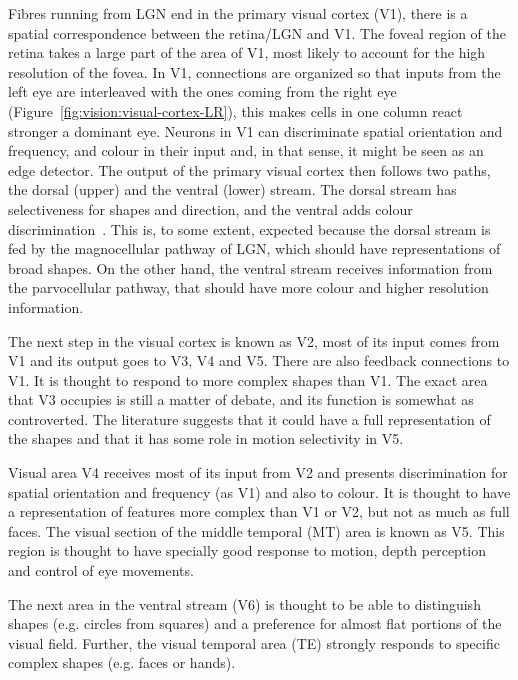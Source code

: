 Fibres running from LGN end in the primary visual cortex (V1), there is a spatial correspondence between the retina/LGN and V1. The foveal region of the retina takes a large part of the area of V1, most likely to account for the high resolution of the fovea. In V1, connections are organized so that inputs from the left eye are interleaved with the ones coming from the right eye (Figure~\ref{fig:vision:visual-cortex-LR}), this makes cells in one column react stronger a dominant eye. Neurons in V1 can discriminate spatial orientation and frequency, and colour in their input and, in that sense, it might be seen as an edge detector. The output of the primary visual cortex then follows two paths, the dorsal (upper) and the ventral (lower) stream. The dorsal stream has selectiveness for shapes and direction, and the ventral adds colour discrimination~\cite{thompson2000brain}. This is, to some extent, expected because the dorsal stream is fed by the magnocellular pathway of LGN, which should have representations of broad shapes. On the other hand, the ventral stream receives information from the parvocellular pathway, that should have more colour and higher resolution information.

The next step in the visual cortex is known as V2, most of its input comes from V1 and its output goes to V3, V4 and V5. There are also feedback connections to V1. It is thought to respond to more complex shapes than V1. The exact area that V3 occupies is still a matter of debate, and its function is somewhat as controverted. The literature suggests that it could have a full representation of the shapes and that it has some role in motion selectivity in V5. 

Visual area V4 receives most of its input from V2 and presents 
discrimination for spatial orientation and frequency (as V1) and also to colour. It is thought to have a representation of features more complex than V1 or V2, but not as much as full faces. The visual section of the middle temporal (MT) area is known as V5. This region is thought to have specially good response to motion, depth perception and control of eye movements. 

The next area in the ventral stream (V6) is thought to be able to distinguish shapes (e.g. circles from squares) and a preference for almost flat portions of the visual field. Further, the visual temporal area (TE) strongly responds to specific complex shapes (e.g. faces or  hands).

